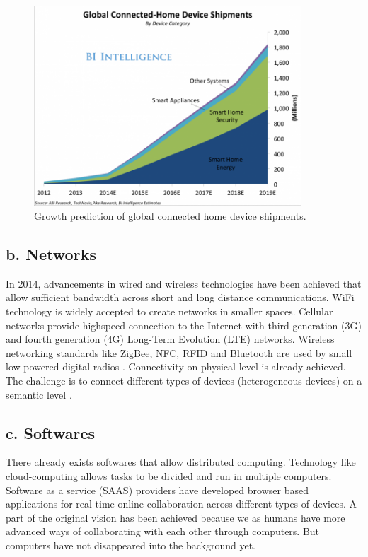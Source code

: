 \begin{figure}
  \centering
  \includegraphics[width=10cm]{figures/connectedhomedevicecategories-1.png}
  \caption{Growth prediction of global connected home device shipments.}
  \label{fig:growth_home_device_with_categories}
\end{figure}

\subsection*{b. Networks}

In 2014, advancements in wired and wireless technologies have been achieved that allow sufficient bandwidth across short and long distance communications. WiFi technology is widely accepted to create networks in smaller spaces. Cellular networks provide highspeed connection to the Internet with third generation (3G) and fourth generation (4G) Long-Term Evolution (LTE) networks. Wireless networking standards like ZigBee, NFC, RFID and Bluetooth are used by small low powered digital radios \cite{warriach2013state}. Connectivity on physical level is already achieved. The challenge is to connect different types of devices (heterogeneous devices) on a semantic level \cite{pahl2014distributed}.

\subsection*{c. Softwares}

There already exists softwares that allow distributed computing. Technology like cloud-computing allows tasks to be divided and run in multiple computers. Software as a service (SAAS) providers have developed browser based applications for real time online collaboration across different types of devices. A part of the original vision has been achieved because we as humans have more advanced ways of collaborating with each other through computers. But computers have not disappeared into the background yet.

